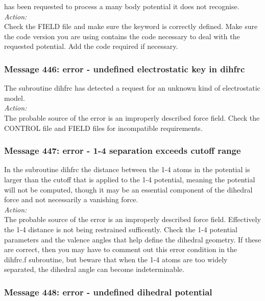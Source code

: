 \D{} has been requested to process a many body potential it does not
recognise. \\

\noindent
{\em Action:} \\
Check the FIELD file and make sure the keyword is correctly defined.
Make sure the code version you are using contains the code necessary to
deal with the requested potential. Add the code required if
necessary.

\subsubsection*{Message 446: error - undefined electrostatic key in 
dihfrc}

The subroutine {\sc dihfrc} has detected a request for an unknown kind
of electrostatic model. \\

\noindent
{\em Action:} \\ The probable source of the error is an improperly
described force field. Check the CONTROL file and FIELD files for
incompatible requirements.\\

\subsubsection*{Message 447: error - 1-4 separation exceeds cutoff range}

In the subroutine {\sc dihfrc} the distance between the 1-4 atoms in
the potential is larger than the cutoff that is applied to the 1-4
potential, meaning the potential will not be computed, though it may
be an essential component of the dihedral force and not necessarily a
vanishing force.
\\

\noindent
{\em Action:} \\ The probable source of the error is an improperly
described force field. Effectively the 1-4 distance is not being
restrained sufficently. Check the 1-4 potential parameters and the
valence angles that help define the dihedral geometry. If these are
correct, then you may have to comment out this error condition in the
{\sc dihfrc.f} subroutine, but beware that when the 1-4 atoms are too
widely separated, the dihedral angle can become indeterminable.

\subsubsection*{Message 448: error - undefined dihedral potential}

